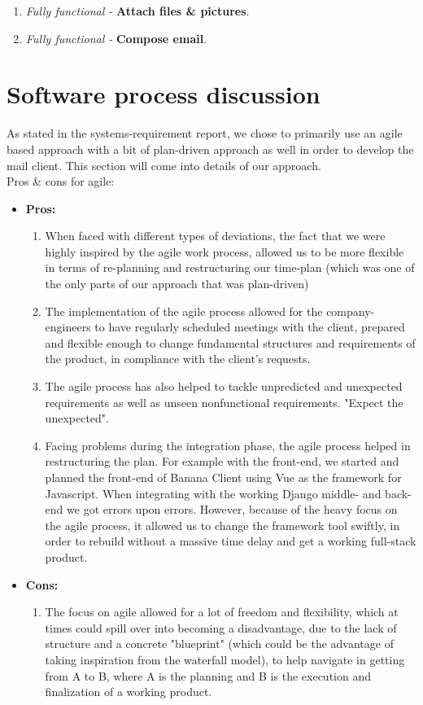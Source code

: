 \documentclass{article}
\begin{document}
\begin{enumerate}
    \item \textit{Fully functional - }\textbf{Attach files \& pictures}.
    
    
    \item \textit{Fully functional - }\textbf{Compose email}. 
    
\end{enumerate}
\newpage

\section*{Software process discussion}
As stated in the systems-requirement report, we chose to primarily use an agile based approach with a bit of plan-driven approach as well in order to develop the mail client. This section will come into details of our approach. \\
Pros \& cons for agile:
\begin{itemize}
    \item \textbf{Pros: } 
    \begin{enumerate}
         \item When faced with different types of deviations, the fact that we were highly inspired by the agile work process, allowed us to be more flexible in terms of re-planning and restructuring our time-plan (which was one of the only parts of our approach that was plan-driven)
        \item The implementation of the agile process allowed for the company-engineers to have regularly scheduled meetings with the client, prepared and flexible enough to change fundamental structures and requirements of the product, in compliance with the client's requests.
        \item The agile process has also helped to tackle unpredicted and unexpected requirements as well as unseen nonfunctional requirements. "Expect the unexpected". 
        \item Facing problems during the integration phase, the agile process helped in restructuring the plan. For example with the front-end, we started and planned the front-end of Banana Client using Vue as the framework for Javascript. When integrating with the working Django middle- and back-end we got errors upon errors. However, because of the heavy focus on the agile process, it allowed us to change the framework tool swiftly, in order to rebuild without a massive time delay and get a working full-stack product.   
    \end{enumerate}
    \item \textbf{Cons: } 
    \begin{enumerate}
        \item The focus on agile allowed for a lot of freedom and flexibility, which at times could spill over into becoming a disadvantage, due to the lack of structure and a concrete "blueprint" (which could be the advantage of taking inspiration from the waterfall model), to help navigate in getting from A to B, where A is the planning and B is the execution and finalization of a working product.
    \end{enumerate}
\end{itemize}
\end{document}
